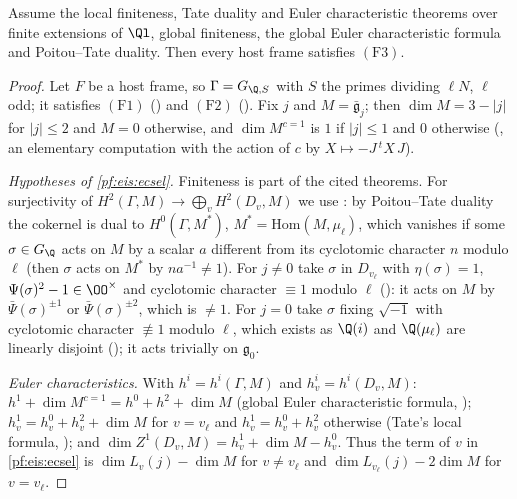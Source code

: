 \begin{proposition}\label{pf:eis:hfcount}
Assume the local finiteness, Tate duality and Euler characteristic theorems over finite extensions of $\Ql$, global finiteness, the
global Euler characteristic formula and Poitou--Tate duality. Then every host frame satisfies $(\mathrm{F3})$.
\end{proposition}

\begin{proof}
Let $F$ be a host frame, so $\Gamma=G_{\Q,S}$ with $S$ the primes dividing $\ell N$, $\ell$ odd; it satisfies $(\mathrm{F1})$
() and $(\mathrm{F2})$ ().
Fix $j$ and $M=\bar{\mathfrak g}_j$; then $\dim M=3-|j|$ for $|j|\le2$ and $M=0$ otherwise, and $\dim M^{c=1}$ is $1$ if $|j|\le1$ and $0$ otherwise
(, an elementary computation with the action of $c$ by
$X\mapsto-J\,{}^tX\,J$).

\emph{Hypotheses of \cref{pf:eis:ecsel}.} Finiteness is part of the cited theorems. For surjectivity of $H^2(\Gamma,M)\to\bigoplus_vH^2(D_v,M)$ we
use : by Poitou--Tate duality the cokernel is dual to $H^0(\Gamma,M^*)$,
$M^*=\mathrm{Hom}(M,\mu_\ell)$, which vanishes if some $\sigma\in G_\Q$ acts on $M$ by a scalar $a$ different from its cyclotomic character
$n$ modulo $\ell$ (then $\sigma$ acts on $M^*$ by $na^{-1}\ne1$). For $j\ne0$ take $\sigma$ in $D_{v_\ell}$ with $\eta(\sigma)=1$,
$\Psi(\sigma)^2-1\in\OO^\times$ and cyclotomic character $\equiv1$ modulo $\ell$
(): it acts on $M$ by $\bar\Psi(\sigma)^{\pm1}$ or $\bar\Psi(\sigma)^{\pm2}$, which is $\ne1$.
For $j=0$ take $\sigma$ fixing $\sqrt{-1}$ with cyclotomic character $\not\equiv1$ modulo $\ell$, which exists as $\Q(i)$ and $\Q(\mu_\ell)$ are
linearly disjoint (); it acts trivially on
$\mathfrak g_0$.

\emph{Euler characteristics.} With $h^i=h^i(\Gamma,M)$ and $h^i_v=h^i(D_v,M)$: $h^1+\dim M^{c=1}=h^0+h^2+\dim M$ (global Euler characteristic
formula, ); $h^1_v=h^0_v+h^2_v+\dim M$ for $v=v_\ell$ and
$h^1_v=h^0_v+h^2_v$ otherwise (Tate's local formula, ); and
$\dim Z^1(D_v,M)=h^1_v+\dim M-h^0_v$. Thus the term of $v$ in \cref{pf:eis:ecsel} is $\dim L_v(j)-\dim M$ for $v\ne v_\ell$ and
$\dim L_{v_\ell}(j)-2\dim M$ for $v=v_\ell$.


\end{proof}
